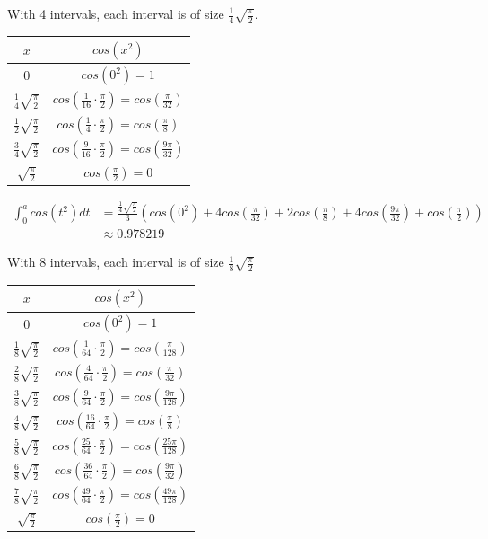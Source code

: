 \documentclass[9pt]{article}
\begin{document}
With 4 intervals, each interval is of size $\frac{1}{4} \sqrt{\frac{\pi}{2}}$.

\begin{center}
  \begin{tabular}{|c|c|}
    \hline
    \rowcolor{Gray}
    $x$ & $cos(x^2)$ \\ \hline
    $0$ & $cos(0^2) = 1$ \\ \hline
    $\frac{1}{4} \sqrt{\frac{\pi}{2}}$ & $cos(\frac{1}{16} \cdot \frac{\pi}{2}) = cos(\frac{\pi}{32})$ \\ \hline
    $\frac{1}{2} \sqrt{\frac{\pi}{2}}$ & $cos(\frac{1}{4} \cdot \frac{\pi}{2}) = cos(\frac{\pi}{8})$ \\ \hline
    $\frac{3}{4} \sqrt{\frac{\pi}{2}}$ & $cos(\frac{9}{16} \cdot \frac{\pi}{2}) = cos(\frac{9\pi}{32})$ \\ \hline
    $\sqrt{\frac{\pi}{2}}$ & $cos(\frac{\pi}{2}) = 0$ \\ \hline
  \end{tabular}
\end{center}

\begin{align*}
  \int_0^a cos(t^2) dt &= \frac{\frac{1}{4} \sqrt{\frac{\pi}{2}}}{3} (cos(0^2 ) + 4cos(\frac{\pi}{32}) + 2cos(\frac{\pi}{8}) + 4cos(\frac{9\pi}{32}) + cos(\frac{\pi}{2})) \\
  &\approx 0.978219
\end{align*}

With 8 intervals, each interval is of size $\frac{1}{8} \sqrt{\frac{\pi}{2}}$

\begin{center}
  \begin{tabular}{|c|c|}
    \hline
    \rowcolor{Gray}
    $x$ & $cos(x^2)$ \\ \hline
    $0$ & $cos(0^2) = 1$ \\ \hline
    $\frac{1}{8} \sqrt{\frac{\pi}{2}}$ & $cos(\frac{1}{64} \cdot \frac{\pi}{2}) = cos(\frac{\pi}{128})$ \\ \hline
    $\frac{2}{8} \sqrt{\frac{\pi}{2}}$ & $cos(\frac{4}{64} \cdot \frac{\pi}{2}) = cos(\frac{\pi}{32})$ \\ \hline
    $\frac{3}{8} \sqrt{\frac{\pi}{2}}$ & $cos(\frac{9}{64} \cdot \frac{\pi}{2}) = cos(\frac{9\pi}{128})$ \\ \hline
    $\frac{4}{8} \sqrt{\frac{\pi}{2}}$ & $cos(\frac{16}{64} \cdot \frac{\pi}{2}) = cos(\frac{\pi}{8})$ \\ \hline
    $\frac{5}{8} \sqrt{\frac{\pi}{2}}$ & $cos(\frac{25}{64} \cdot \frac{\pi}{2}) = cos(\frac{25\pi}{128})$ \\ \hline
    $\frac{6}{8} \sqrt{\frac{\pi}{2}}$ & $cos(\frac{36}{64} \cdot \frac{\pi}{2}) = cos(\frac{9\pi}{32})$ \\ \hline
    $\frac{7}{8} \sqrt{\frac{\pi}{2}}$ & $cos(\frac{49}{64} \cdot \frac{\pi}{2}) = cos(\frac{49\pi}{128})$ \\ \hline
    $\sqrt{\frac{\pi}{2}}$ & $cos(\frac{\pi}{2}) = 0$ \\ \hline
  \end{tabular}
\end{center}
\end{document}
